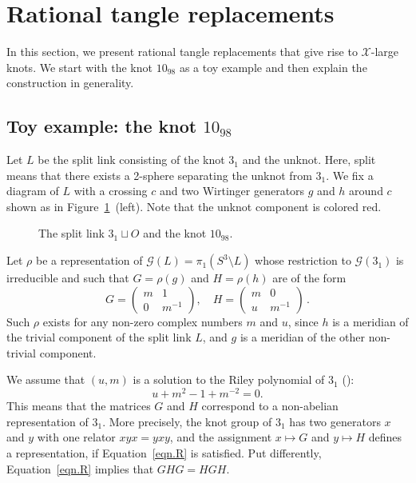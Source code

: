 \documentclass[12pt,reqno]{amsart}
\theoremstyle{definition}
\def\calG{\mathcal G}
\begin{document}
\section{Rational tangle replacements}
\label{sec.tangle}

In this section, we present rational tangle replacements that give rise to $\mathcal{X}$-large knots.
We start with the knot $10_{98}$ as a toy example and then  explain the construction in generality.
\subsection{Toy example: the knot $10_{98}$}  
\label{sec.toyexample}

Let $L$ be the split link consisting of the knot $3_1$ and the unknot. Here, split means that there exists  a 2-sphere separating the unknot from $3_1$.
We fix a diagram of $L$ with a crossing $c$ and two Wirtinger generators $g$ and $h$  around $c$ shown as in Figure~\ref{fig.1098}~(left). Note that the unknot component is colored red. 


\begin{figure}[!htbp]
    \centering
    
    \caption{The split link $3_1 \sqcup O$ and the knot $10_{98}$.}
    \label{fig.1098}
\end{figure}

Let $\rho$ be a representation of $\calG(L)=\pi_1(S^3 \setminus L)$ whose restriction to $\calG(3_1)$ is irreducible and such that $G=\rho(g)$ and $H=\rho(h)$ are of the form
\begin{equation}
\label{eqn.normalization}
    G = \begin{pmatrix} m & 1 \\ 0 & m^{-1} \end{pmatrix}, \quad
    H = \begin{pmatrix} m & 0 \\ u & m^{-1} \end{pmatrix} \,.
\end{equation}
Such $\rho$ exists for any non-zero complex numbers $m$ and $u$, since $h$ is a meridian of the trivial component of the split link $L$, and $g$ is a meridian of the other non-trivial component.

We assume that $(u,m)$ is a solution to the Riley polynomial of $3_1$ 
(\cite{Riley1984}): 
\begin{equation}
\label{eqn.R} u+m^2-1+m^{-2}=0.    
\end{equation}
This means that the matrices $G$ and $H$ correspond to a non-abelian representation of $3_1$.  More precisely, the knot group of $3_1$ has two generators $x$ and $y$ with one relator $xyx=yxy$, and the assignment $x \mapsto G$ and $y \mapsto H$ defines a representation, if Equation~\eqref{eqn.R} is satisfied. Put differently, Equation~\eqref{eqn.R} implies that $GHG = HGH$.
\end{document}
